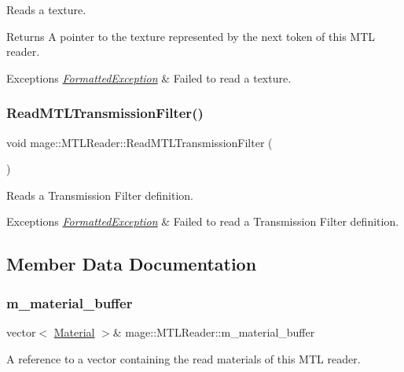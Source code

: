 Reads a texture.

\begin{DoxyReturn}{Returns}
A pointer to the texture represented by the next token of this M\+TL reader. 
\end{DoxyReturn}

\begin{DoxyExceptions}{Exceptions}
{\em \hyperlink{structmage_1_1_formatted_exception}{Formatted\+Exception}} & Failed to read a texture. \\
\hline
\end{DoxyExceptions}
\hypertarget{classmage_1_1_m_t_l_reader_a4d5819606b5ea81862852587b2e1511b}{}\label{classmage_1_1_m_t_l_reader_a4d5819606b5ea81862852587b2e1511b} 
\subsubsection{\texorpdfstring{Read\+M\+T\+L\+Transmission\+Filter()}{ReadMTLTransmissionFilter()}}
{\footnotesize\ttfamily void mage\+::\+M\+T\+L\+Reader\+::\+Read\+M\+T\+L\+Transmission\+Filter (\begin{DoxyParamCaption}{ }\end{DoxyParamCaption})\hspace{0.3cm}{\ttfamily [private]}}

Reads a Transmission Filter definition.


\begin{DoxyExceptions}{Exceptions}
{\em \hyperlink{structmage_1_1_formatted_exception}{Formatted\+Exception}} & Failed to read a Transmission Filter definition. \\
\hline
\end{DoxyExceptions}


\subsection{Member Data Documentation}
\hypertarget{classmage_1_1_m_t_l_reader_a6382e0e9fce6581b129d18f5d82994c2}{}\label{classmage_1_1_m_t_l_reader_a6382e0e9fce6581b129d18f5d82994c2} 
\subsubsection{\texorpdfstring{m\+\_\+material\+\_\+buffer}{m\_material\_buffer}}
{\footnotesize\ttfamily vector$<$ \hyperlink{structmage_1_1_material}{Material} $>$\& mage\+::\+M\+T\+L\+Reader\+::m\+\_\+material\+\_\+buffer\hspace{0.3cm}{\ttfamily [private]}}

A reference to a vector containing the read materials of this M\+TL reader. 